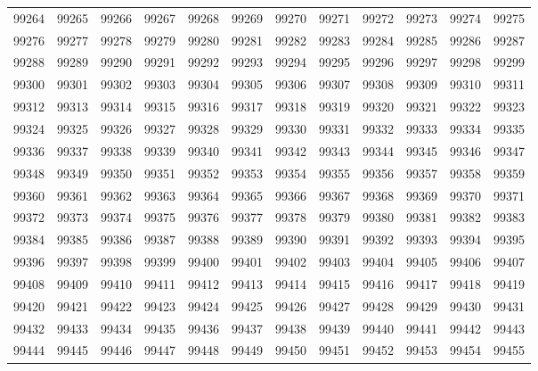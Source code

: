 \begin{center}
\begin{longtable}{llllllllllll}
99264 &99265 &99266 &99267 &99268 &99269 &99270 &99271 &99272 &99273 &99274 &99275 \\
99276 &99277 &99278 &99279 &99280 &99281 &99282 &99283 &99284 &99285 &99286 &99287 \\
99288 &99289 &99290 &99291 &99292 &99293 &99294 &99295 &99296 &99297 &99298 &99299 \\
99300 &99301 &99302 &99303 &99304 &99305 &99306 &99307 &99308 &99309 &99310 &99311 \\
99312 &99313 &99314 &99315 &99316 &99317 &99318 &99319 &99320 &99321 &99322 &99323 \\
99324 &99325 &99326 &99327 &99328 &99329 &99330 &99331 &99332 &99333 &99334 &99335 \\
99336 &99337 &99338 &99339 &99340 &99341 &99342 &99343 &99344 &99345 &99346 &99347 \\
99348 &99349 &99350 &99351 &99352 &99353 &99354 &99355 &99356 &99357 &99358 &99359 \\
99360 &99361 &99362 &99363 &99364 &99365 &99366 &99367 &99368 &99369 &99370 &99371 \\
99372 &99373 &99374 &99375 &99376 &99377 &99378 &99379 &99380 &99381 &99382 &99383 \\
99384 &99385 &99386 &99387 &99388 &99389 &99390 &99391 &99392 &99393 &99394 &99395 \\
99396 &99397 &99398 &99399 &99400 &99401 &99402 &99403 &99404 &99405 &99406 &99407 \\
99408 &99409 &99410 &99411 &99412 &99413 &99414 &99415 &99416 &99417 &99418 &99419 \\
99420 &99421 &99422 &99423 &99424 &99425 &99426 &99427 &99428 &99429 &99430 &99431 \\
99432 &99433 &99434 &99435 &99436 &99437 &99438 &99439 &99440 &99441 &99442 &99443 \\
99444 &99445 &99446 &99447 &99448 &99449 &99450 &99451 &99452 &99453 &99454 &99455 \\
\end{longtable}
\end{center}
\clearpage

